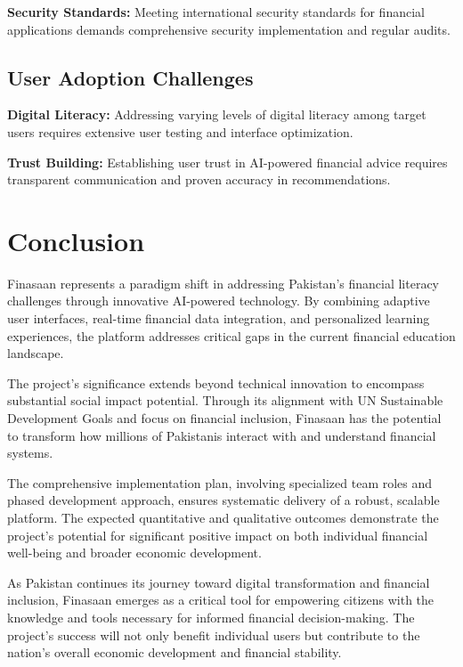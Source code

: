 \documentclass[conference]{IEEEtran}
\begin{document}
\textbf{Security Standards:} Meeting international security standards for financial applications demands comprehensive security implementation and regular audits.

\subsection{User Adoption Challenges}

\textbf{Digital Literacy:} Addressing varying levels of digital literacy among target users requires extensive user testing and interface optimization.

\textbf{Trust Building:} Establishing user trust in AI-powered financial advice requires transparent communication and proven accuracy in recommendations.

\section{Conclusion}

Finasaan represents a paradigm shift in addressing Pakistan's financial literacy challenges through innovative AI-powered technology. By combining adaptive user interfaces, real-time financial data integration, and personalized learning experiences, the platform addresses critical gaps in the current financial education landscape.

The project's significance extends beyond technical innovation to encompass substantial social impact potential. Through its alignment with UN Sustainable Development Goals and focus on financial inclusion, Finasaan has the potential to transform how millions of Pakistanis interact with and understand financial systems.

The comprehensive implementation plan, involving specialized team roles and phased development approach, ensures systematic delivery of a robust, scalable platform. The expected quantitative and qualitative outcomes demonstrate the project's potential for significant positive impact on both individual financial well-being and broader economic development.

As Pakistan continues its journey toward digital transformation and financial inclusion, Finasaan emerges as a critical tool for empowering citizens with the knowledge and tools necessary for informed financial decision-making. The project's success will not only benefit individual users but contribute to the nation's overall economic development and financial stability.
\end{document}
